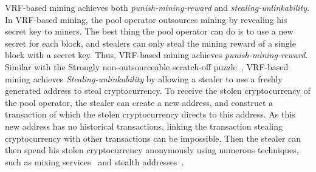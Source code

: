 VRF-based mining achieves both \emph{punish-mining-reward} and \emph{stealing-unlinkability}.
In VRF-based mining, the pool operator outsources mining by revealing his secret key to miners.
The best thing the pool operator can do is to use a new secret for each block, and stealers can only steal the mining reward of a single block with a secret key.
Thus, VRF-based mining achieves \emph{punish-mining-reward}.
Similar with the Strongly non-outsourceable scratch-off puzzle~\cite{miller2015nonoutsourceable}, VRF-based mining achieves \emph{Stealing-unlinkability} by allowing a stealer to use a freshly generated address to steal cryptocurrency.
To receive the stolen cryptocurrency of the pool operator, the stealer can create a new address, and construct a transaction of which the stolen cryptocurrency directs to this address.
As this new address has no historical transactions, linking the transaction stealing cryptocurrency with other transactions can be impossible.
Then the stealer can then spend his stolen cryptocurrency anonymously using numerous techniques, such as mixing services~\cite{maxwell2013coinjoin}\cite{bonneau2014mixcoin}\cite{ruffing2014coinshuffle}\cite{heilman2017tumblebit} and stealth addresses~\cite{van2013cryptonote}.



